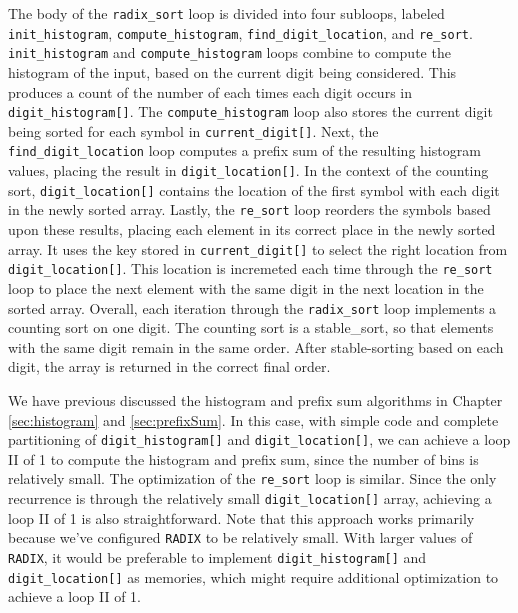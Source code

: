 The body of the \lstinline{radix_sort} loop is divided into four subloops, labeled \lstinline{init_histogram}, \lstinline{compute_histogram}, \lstinline{find_digit_location}, and \lstinline{re_sort}.  \lstinline{init_histogram} and \lstinline{compute_histogram} loops combine to compute the histogram of the input, based on the current digit being considered.  This produces a count of the number of each times each digit occurs in \lstinline{digit_histogram[]}.  The \lstinline{compute_histogram} loop also stores the current digit being sorted for each symbol in \lstinline{current_digit[]}.   Next, the \lstinline{find_digit_location} loop computes a prefix sum of the resulting histogram values, placing the result in \lstinline{digit_location[]}.  In the context of the counting sort, \lstinline{digit_location[]} contains the location of the first symbol with each digit in the newly sorted array.  Lastly, the \lstinline{re_sort} loop reorders the symbols based upon these results, placing each element in its correct place in the newly sorted array.    It uses the key stored in \lstinline{current_digit[]} to select the right location from \lstinline{digit_location[]}. This location is incremeted each time through the \lstinline{re_sort} loop to place the next element with the same digit in the next location in the sorted array.  Overall, each iteration through the \lstinline{radix_sort} loop implements a counting sort on one digit.  The counting sort is a \gls{stable_sort}, so that elements with the same digit remain in the same order.  After stable-sorting based on each digit, the array is returned in the correct final order.

We have previous discussed the histogram and prefix sum algorithms in Chapter \ref{sec:histogram} and \ref{sec:prefixSum}.  In this case, with simple code and complete partitioning of \lstinline{digit_histogram[]} and \lstinline{digit_location[]}, we can achieve a loop II of 1 to compute the histogram and prefix sum, since the number of bins is relatively small.  The optimization of the \lstinline{re_sort} loop is similar.  Since the only recurrence is through the relatively small \lstinline{digit_location[]} array, achieving a loop II of 1 is also straightforward.  Note that this approach works primarily because we've configured \lstinline{RADIX} to be relatively small.  With larger values of \lstinline{RADIX}, it would be preferable to implement \lstinline{digit_histogram[]} and \lstinline{digit_location[]} as memories, which might require additional optimization to achieve a loop II of 1.

